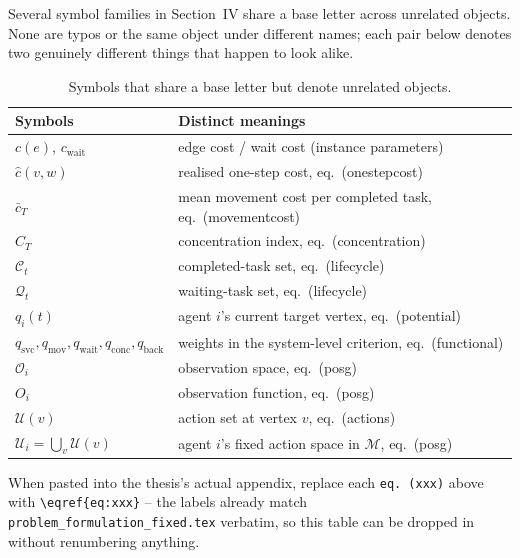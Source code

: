 \documentclass[11pt]{article}
\begin{document}
Several symbol families in Section~IV share a base letter across unrelated
objects. None are typos or the same object under different names; each pair
below denotes two genuinely different things that happen to look alike.

\begin{table}[h]
  \centering
  \caption{Symbols that share a base letter but denote unrelated objects.}
  \label{tab:notation}
  \begin{tabular}{ll}
    \toprule
    Symbols & Distinct meanings \\
    \midrule
    $c(e)$, $c_{\mathrm{wait}}$ & edge cost / wait cost (instance parameters) \\
    $\hat{c}(v,w)$ & realised one-step cost, eq.~(onestepcost) \\
    $\bar{c}_T$ & mean movement cost per completed task, eq.~(movementcost) \\
    $C_T$ & concentration index, eq.~(concentration) \\
    $\mathcal{C}_t$ & completed-task set, eq.~(lifecycle) \\
    \addlinespace
    $\mathcal{Q}_t$ & waiting-task set, eq.~(lifecycle) \\
    $q_i(t)$ & agent $i$'s current target vertex, eq.~(potential) \\
    $q_{\mathrm{svc}}, q_{\mathrm{mov}}, q_{\mathrm{wait}}, q_{\mathrm{conc}}, q_{\mathrm{back}}$
      & weights in the system-level criterion, eq.~(functional) \\
    \addlinespace
    $\mathcal{O}_i$ & observation space, eq.~(posg) \\
    $O_i$ & observation function, eq.~(posg) \\
    \addlinespace
    $\mathcal{U}(v)$ & action set at vertex $v$, eq.~(actions) \\
    $\mathcal{U}_i = \bigcup_{v} \mathcal{U}(v)$ & agent $i$'s fixed action space in $\mathcal{M}$, eq.~(posg) \\
    \bottomrule
  \end{tabular}
\end{table}

\noindent When pasted into the thesis's actual appendix, replace each
\texttt{eq.~(xxx)} above with \verb|\eqref{eq:xxx}| -- the labels already
match \texttt{problem\_formulation\_fixed.tex} verbatim, so this table can be
dropped in without renumbering anything.
\end{document}
